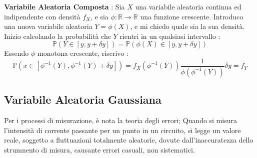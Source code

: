 \documentclass[12pt, letterpaper]{article}
\newcommand{\R}{{\mathbb R}}
\newcommand{\Prob}{{\mathbb P}}
\begin{document}
\textbf{Variabile Aleatoria Composta} :
Sia \(X\) una variabile aleatoria continua ed indipendente con densità \(f_X\), e sia 
\(\phi:\R\rightarrow\R\) una funzione crescente. Introduco una nuova variabile 
aleatoria \(Y=\phi(X)\), e mi chiedo quale sia la sua densità. Inizio calcolando 
la probabilità che \(Y\) rientri in un qualsiasi intervallo : \begin{equation}
    \Prob(Y\in[y,y+\delta y])=\Prob(\phi(X)\in[y,y+\delta y])
\end{equation} 
Essendo \(\phi\) monotona crescente, riscrivo : \begin{equation}
    \Prob(x\in[\phi^{-1}(Y),\phi^{-1}(Y)+\delta y] )=f_X(\phi^{-1}(Y))\dfrac{1}{\phi(\phi^{-1}(Y))}\delta y=f_Y
\end{equation}
\subsection{Variabile Aleatoria Gaussiana}
Per i processi di misurazione, è nota la teoria degli errori; Quando si misura l'intensità di corrente 
passante per un punto in un circuito, si legge un valore reale, soggetto a fluttuazioni totalmente 
aleatorie, dovute dall'inaccuratezza dello strumnento di misura, causante errori casuali, non sistematici.\\ 
\end{document}

